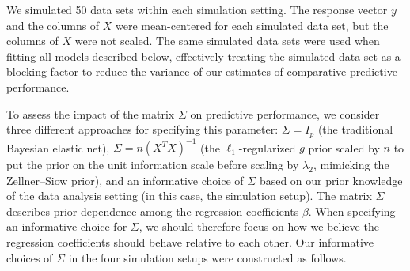 \documentclass[12pt]{article}
\begin{document}
We simulated 50 data sets within each simulation setting. The response vector $y$ and the columns of
$X$ were mean-centered for each simulated data set, but the columns of $X$ were not scaled. The same
simulated data sets were used when fitting all models described below, effectively treating the simulated
data set as a blocking factor to reduce the variance of our estimates of comparative predictive performance.

To assess the impact of the matrix $\Sigma$ on predictive performance, we consider three different
approaches for specifying this parameter: $\Sigma = I_p$ (the traditional Bayesian elastic net),
$\Sigma = n(X^TX)^{-1}$ (the $\ell_1$-regularized $g$ prior scaled by $n$ to put the prior on the
unit information scale before scaling by $\lambda_2$, mimicking the Zellner--Siow prior), and an 
informative choice of $\Sigma$ based on our prior knowledge of the data analysis setting (in this case, 
the simulation setup).  The matrix $\Sigma$ describes prior dependence among the regression coefficients 
$\beta$. When specifying an informative choice 
for $\Sigma$, we should therefore focus on how we believe the regression coefficients should behave relative 
to each other.  Our informative choices of $\Sigma$ in the four simulation setups were constructed as follows.
\end{document}
